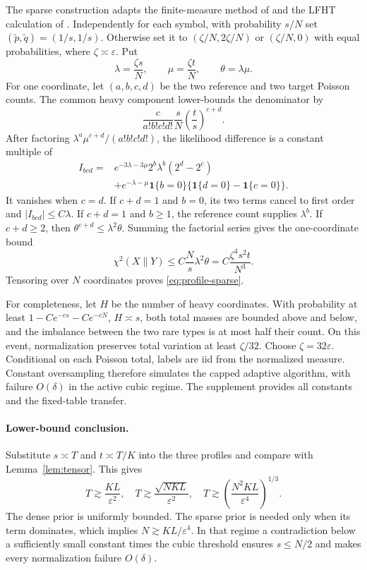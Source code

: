 \documentclass[twoside]{article}
\newcommand{\one}{\mathbf 1}
\begin{document}
The sparse construction adapts the finite-measure method of \citet{diakonikolas2021highprob} and the LFHT calculation of \citet{gerber2023classification}. Independently for each symbol, with probability $s/N$ set $(\tilde p,\tilde q)=(1/s,1/s)$. Otherwise set it to $(\zeta/N,2\zeta/N)$ or $(\zeta/N,0)$ with equal probabilities, where $\zeta\asymp\varepsilon$. Put \[ \lambda=\frac{\zeta s}{N},\qquad \mu=\frac{\zeta t}{N},\qquad \theta=\lambda\mu. \] For one coordinate, let $(a,b,c,d)$ be the two reference and two target Poisson counts. The common heavy component lower-bounds the denominator by \[ \frac{c}{a!b!c!d!}\frac{s}{N}\left(\frac ts\right)^{c+d}. \] After factoring $\lambda^a\mu^{c+d}/(a!b!c!d!)$, the likelihood difference is a constant multiple of
\begin{align*}
I_{bcd}={}&e^{-3\lambda-3\mu}2^b\lambda^b(2^d-2^c)\\
&+e^{-\lambda-\mu}\one\{b=0\}
\{\one\{d=0\}-\one\{c=0\}\}.
\end{align*}
It vanishes when $c=d$. If $c+d=1$ and $b=0$, its two terms cancel to first order and $|I_{bcd}|\leq C\lambda$. If $c+d=1$ and $b\geq1$, the reference count supplies $\lambda^b$. If $c+d\geq2$, then $\theta^{c+d}\leq\lambda^2\theta$. Summing the factorial series gives the one-coordinate bound \[ \chi^2(X\|Y)\leq C\frac Ns\lambda^2\theta =C\frac{\zeta^4s^2t}{N^3}. \] Tensoring over $N$ coordinates proves \eqref{eq:profile-sparse}.

For completeness, let $H$ be the number of heavy coordinates. With probability at least $1-Ce^{-cs}-Ce^{-cN}$, $H\asymp s$, both total masses are bounded above and below, and the imbalance between the two rare types is at most half their count. On this event, normalization preserves total variation at least $\zeta/32$. Choose $\zeta=32\varepsilon$. Conditional on each Poisson total, labels are iid from the normalized measure. Constant oversampling therefore simulates the capped adaptive algorithm, with failure $O(\delta)$ in the active cubic regime. The supplement provides all constants and the fixed-table transfer.

\paragraph{Lower-bound conclusion.} Substitute $s\asymp T$ and $t\asymp T/K$ into the three profiles and compare with Lemma~\ref{lem:tensor}. This gives
\[ T\gtrsim \frac{KL}{\varepsilon^2},\quad T\gtrsim\frac{\sqrt{NKL}}{\varepsilon^2},\quad T\gtrsim\left(\frac{N^2KL}{\varepsilon^4}\right)^{1/3}. \] The dense prior is uniformly bounded. The sparse prior is needed only when its term dominates, which implies $N\gtrsim KL/\varepsilon^4$. In that regime a contradiction below a sufficiently small constant times the cubic threshold ensures $s\leq N/2$ and makes every normalization failure $O(\delta)$.
\end{document}
